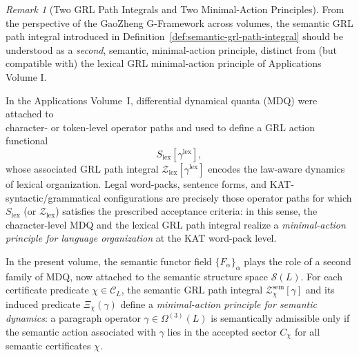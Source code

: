 \documentclass[11pt]{book}
\theoremstyle{plain}
\theoremstyle{definition}
\theoremstyle{remark}
\newtheorem{remark}[theorem]{Remark}
\begin{document}
\begin{remark}[Two GRL Path Integrals and Two Minimal-Action Principles]
\label{rem:two-grl-pi-two-actions}
From the perspective of the GaoZheng G-Framework across volumes, the
semantic GRL path integral introduced in
Definition~\ref{def:semantic-grl-path-integral} should be understood as a
\emph{second}, semantic, minimal-action principle, distinct from (but
compatible with) the lexical GRL minimal-action principle of Applications
Volume I.

In the Applications Volume~I, differential dynamical quanta (MDQ) were
attached to \\character- or token-level operator paths and used to define a
GRL action functional
\[
  S_{\mathrm{lex}}[\gamma^{\mathrm{lex}}],
\]
whose associated GRL path integral
$\mathcal{Z}_{\mathrm{lex}}[\gamma^{\mathrm{lex}}]$ encodes the
law-aware dynamics of lexical organization. Legal word-packs, sentence
forms, and KAT-syntactic/grammatical configurations are precisely those
operator paths for which $S_{\mathrm{lex}}$ (or $\mathcal{Z}_{\mathrm{lex}}$)
satisfies the prescribed acceptance criteria: in this sense, the
character-level MDQ and the lexical GRL path integral realize a
\emph{minimal-action principle for language organization} at the KAT
word-pack level.

In the present volume, the semantic functor field
$\{F_\alpha\}_\alpha$ plays the role of a second family of MDQ, now
attached to the semantic structure space $\mathcal{S}(L)$. For each
certificate predicate $\chi\in\mathcal{C}_L$, the semantic GRL path
integral $\mathcal{Z}^{\mathrm{sem}}_\chi[\gamma]$ and its induced
predicate $\Xi_\chi(\gamma)$ define a \emph{minimal-action principle for
semantic dynamics}: a paragraph operator $\gamma\in\Omega^{(3)}(L)$ is
semantically admissible only if the semantic action associated with
$\gamma$ lies in the accepted sector $C_\chi$ for all semantic
certificates $\chi$.


\end{remark}
\end{document}
